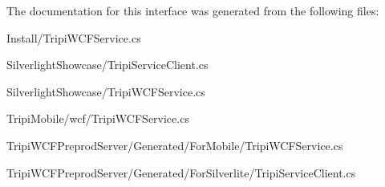 The documentation for this interface was generated from the following files:\begin{DoxyCompactItemize}
\item 
Install/TripiWCFService.cs\item 
SilverlightShowcase/TripiServiceClient.cs\item 
SilverlightShowcase/TripiWCFService.cs\item 
TripiMobile/wcf/TripiWCFService.cs\item 
TripiWCFPreprodServer/Generated/ForMobile/TripiWCFService.cs\item 
TripiWCFPreprodServer/Generated/ForSilverlite/TripiServiceClient.cs\end{DoxyCompactItemize}
